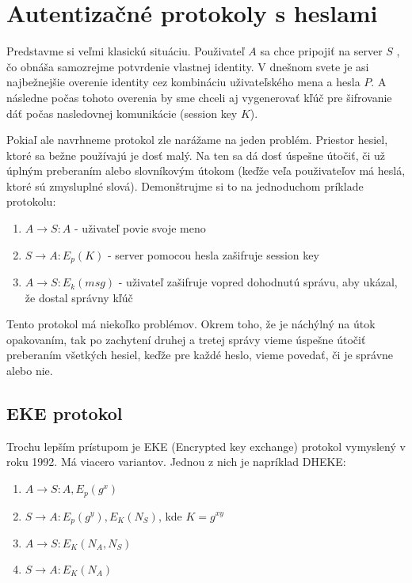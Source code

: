 \section{Autentizačné protokoly s heslami}

Predstavme si veľmi klasickú situáciu. Použivateľ $A$ sa chce pripojiť
na server $S$ , čo obnáša samozrejme potvrdenie vlastnej identity.
V dnešnom svete je asi najbežnejšie overenie identity cez kombináciu
uživateľského mena a hesla $P$. A následne počas tohoto overenia
by sme chceli aj vygenerovať kľúč pre šifrovanie dáť počas nasledovnej
komunikácie (session key $K$).

Pokiaľ ale navrhneme protokol zle narážame na jeden problém. Priestor
hesiel, ktoré sa bežne používajú je dosť malý. Na ten sa dá dosť úspešne
útočiť, či už úplným preberaním alebo slovníkovým útokom (keďže veľa použivateľov
má heslá, ktoré sú zmysluplné slová). Demonštrujme si to na jednoduchom
príklade protokolu:
\begin{enumerate}
\item $A \to S\colon A$ - uživateľ povie svoje meno
\item $S \to A\colon E_p(K)$ - server pomocou hesla zašifruje session key
\item $A \to S\colon E_k(msg)$ - uživateľ zašifruje vopred dohodnutú správu, aby ukázal, že dostal správny kľúč
\end{enumerate}

Tento protokol má niekoľko problémov. Okrem toho, že je náchýlný
na útok opakovaním, tak po zachytení druhej a tretej správy vieme úspešne útočiť
preberaním všetkých hesiel, keďže pre každé heslo, vieme povedať, či je správne alebo nie.

\subsection{EKE protokol}

Trochu lepším prístupom je EKE (Encrypted key exchange) protokol vymyslený 
v roku 1992. Má viacero variantov. Jednou z nich je napríklad DHEKE:

\begin{enumerate}
\item $A\to S\colon A, E_p(g^x)$
\item $S\to A\colon E_p(g^y), E_K(N_S)$, kde $K = g^{xy}$
\item $A\to S\colon E_K(N_A, N_S)$
\item $S\to A\colon E_K(N_A)$
\end{enumerate}

